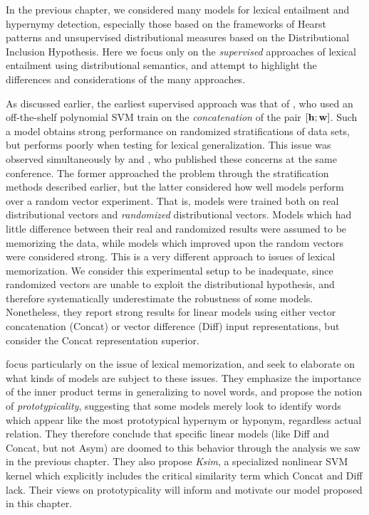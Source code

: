 In the previous chapter, we considered many models for lexical entailment and
hypernymy detection, especially those based on the frameworks of Hearst
patterns and unsupervised distributional measures based on the Distributional
Inclusion Hypothesis. Here we focus only on the {\em supervised} approaches of
lexical entailment using distributional semantics, and attempt to highlight
the differences and considerations of the many approaches.

As discussed earlier, the earliest supervised approach was that of
, who used an off-the-shelf polynomial SVM train on
the {\em concatenation} of the pair $[{\mathbf{h}}; {\mathbf{w}}]$. Such a model obtains strong
performance on randomized stratifications of data sets, but performs poorly
when testing for lexical generalization. This issue was observed simultaneously
by  and , who published
these concerns at the same conference. The former approached the problem
through the stratification methods described earlier, but the latter considered
how well models perform over a random vector experiment. That is, models were
trained both on real distributional vectors and {\em randomized} distributional
vectors. Models which had little difference between their real and randomized
results were assumed to be memorizing the data, while models which improved
upon the random vectors were considered strong. This is a very different
approach to issues of lexical memorization. We consider this experimental
setup to be inadequate, since randomized vectors are unable to exploit the
distributional hypothesis, and therefore systematically underestimate the
robustness of some models. Nonetheless, they report strong results for linear
models using either vector concatenation (Concat) or vector difference (Diff)
input representations, but consider the Concat representation superior.

 focus particularly on the issue of lexical
memorization, and seek to elaborate on what kinds of models are subject to
these issues. They emphasize the importance of the inner product terms in
generalizing to novel words, and propose the notion of {\em prototypicality},
suggesting that some models merely look to identify words which appear like the
most prototypical hypernym or hyponym, regardless actual relation. They
therefore conclude that specific linear models (like Diff and Concat, but not
Asym) are doomed to this behavior through the analysis we saw in the previous
chapter. They also propose {\em Ksim}, a specialized nonlinear SVM kernel which
explicitly includes the critical similarity term which Concat and Diff lack.
Their views on prototypicality will inform and motivate our model proposed in
this chapter.

